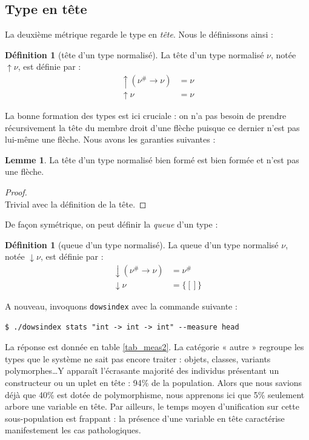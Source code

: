 \documentclass[a4paper]{report}
\newenvironment{preuve} 
	{\begin{proof}~\\} 
	{\end{proof}}
\theoremstyle{definition}
\newtheorem{definition}[theoreme]{Définition}
\newtheorem{lemme}[theoreme]{Lemme}
\newcommand{\dowsindex}{\texttt{dowsindex}\xspace}
\newcommand{\mset}[1]{\{\![#1]\!\}}
\begin{document}

\subsection{Type en tête}

La deuxième métrique regarde le type en \emph{tête}. Nous le définissons ainsi :

\begin{definition}[tête d'un type normalisé]
	La tête d'un type normalisé $\nu$, notée $\uparrow \nu$, est définie par :
	\begin{align*}
			\uparrow (\nu^\# \rightarrow \nu) &=
			\nu
		\\
			\uparrow \nu &=
			\nu
	\end{align*}
\end{definition}

La bonne formation des types est ici cruciale : on n'a pas besoin de prendre récursivement la tête du membre droit d'une flèche puisque ce dernier n'est pas lui-même une flèche. Nous avons les garanties suivantes :

\begin{lemme} \label{bf_implique_tete_bf_et_non_fleche}
	La tête d'un type normalisé bien formé est bien formée et n'est pas une flèche.
\end{lemme}

\begin{preuve}
	Trivial avec la définition de la tête.
\end{preuve}

De façon symétrique, on peut définir la \emph{queue} d'un type :

\begin{definition}[queue d'un type normalisé]
	La queue d'un type normalisé $\nu$, notée $\downarrow \nu$, est définie par :
	\begin{align*}
			\downarrow (\nu^\# \rightarrow \nu) &=
			\nu^\#
		\\
			\downarrow \nu &=
			\mset{}
	\end{align*}
\end{definition}

A nouveau, invoquons \dowsindex avec la commande suivante :

\begin{verbatim}
$ ./dowsindex stats "int -> int -> int" --measure head
\end{verbatim}

La réponse est donnée en table \ref{tab_meas2}. La catégorie « autre » regroupe les types que le système ne sait pas encore traiter : objets, classes, variants polymorphes\dots Y apparaît l'écrasante majorité des individus présentant un constructeur ou un uplet en tête : 94\% de la population. Alors que nous savions déjà que 40\% est dotée de polymorphisme, nous apprenons ici que 5\% seulement arbore une variable en tête. Par ailleurs, le temps moyen d'unification sur cette sous-population est frappant : la présence d'une variable en tête caractérise manifestement les cas pathologiques.
\end{document}
